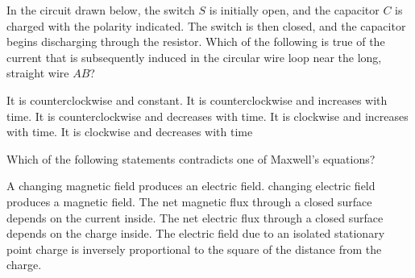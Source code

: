 \documentclass[12pt]{../oss-classkick-exam}
\begin{document}
\begin{questions}
\begin{oneparchoices}
    \choice
  \end{oneparchoices}
  \vspace{.3in}
  \newpage
  
  \question In the circuit drawn below, the switch $S$ is initially open, and
  the capacitor $C$ is charged with the polarity indicated. The switch is then
  closed, and the capacitor begins discharging through the resistor. Which of
  the following is true of the current that is subsequently induced in the
  circular wire loop near the long, straight wire $AB$?

  \begin{minipage}{.3\linewidth}
  \end{minipage}
  \begin{minipage}{.59\linewidth}
    \begin{choices}
      \choice It is counterclockwise and constant.
      \choice It is counterclockwise and increases with time.
      \choice It is counterclockwise and decreases with time.
      \choice It is clockwise and increases with time.
      \choice It is clockwise and decreases with time
    \end{choices}
  \end{minipage}
  \vspace{.3in}
  
  \uplevel{\rule{\linewidth}{.5pt}}
  
  \question Which of the following statements contradicts one of Maxwell's
  equations?
  \begin{choices}
    \choice A changing magnetic field produces an electric field.
    \choice changing electric field produces a magnetic field.
    \choice The net magnetic flux through a closed surface depends on the
    current inside.
    \choice The net electric flux through a closed surface depends on the
    charge inside.
    \choice The electric field due to an isolated stationary point charge is
    inversely proportional to the square of the distance from the charge.
  \end{choices}
  \vspace{.7in}

  \uplevel{\rule{\linewidth}{.5pt}}
  

\end{questions}
\end{document}
